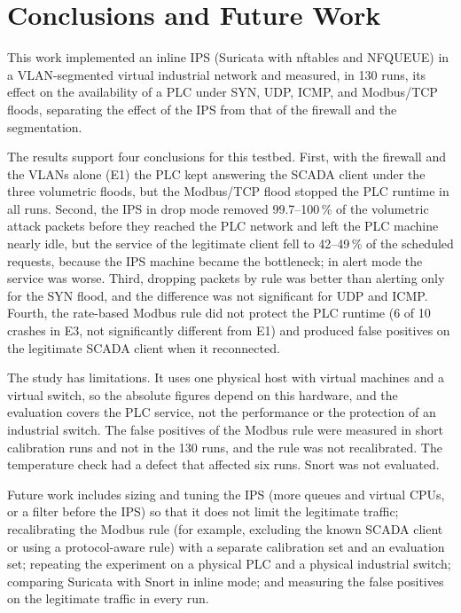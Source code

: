 \section{Conclusions and Future Work}\label{sec:conclusions}
This work implemented an inline IPS (Suricata with nftables and NFQUEUE) in a VLAN-segmented virtual industrial network and measured, in 130 runs, its effect on the availability of a PLC under SYN, UDP, ICMP, and Modbus/TCP floods, separating the effect of the IPS from that of the firewall and the segmentation.

The results support four conclusions for this testbed. First, with the firewall and the VLANs alone (E1) the PLC kept answering the SCADA client under the three volumetric floods, but the Modbus/TCP flood stopped the PLC runtime in all runs. Second, the IPS in drop mode removed 99.7--100\,\% of the volumetric attack packets before they reached the PLC network and left the PLC machine nearly idle, but the service of the legitimate client fell to 42--49\,\% of the scheduled requests, because the IPS machine became the bottleneck; in alert mode the service was worse. Third, dropping packets by rule was better than alerting only for the SYN flood, and the difference was not significant for UDP and ICMP. Fourth, the rate-based Modbus rule did not protect the PLC runtime (6 of 10 crashes in E3, not significantly different from E1) and produced false positives on the legitimate SCADA client when it reconnected.

The study has limitations. It uses one physical host with virtual machines and a virtual switch, so the absolute figures depend on this hardware, and the evaluation covers the PLC service, not the performance or the protection of an industrial switch. The false positives of the Modbus rule were measured in short calibration runs and not in the 130 runs, and the rule was not recalibrated. The temperature check had a defect that affected six runs. Snort was not evaluated.

Future work includes sizing and tuning the IPS (more queues and virtual CPUs, or a filter before the IPS) so that it does not limit the legitimate traffic; recalibrating the Modbus rule (for example, excluding the known SCADA client or using a protocol-aware rule) with a separate calibration set and an evaluation set; repeating the experiment on a physical PLC and a physical industrial switch; comparing Suricata with Snort in inline mode; and measuring the false positives on the legitimate traffic in every run.

